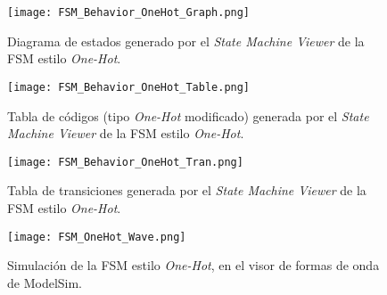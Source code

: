 \begin{figure}[ht]
	\centering
	\texttt{[image: FSM\_Behavior\_OneHot\_Graph.png]}
	\caption{Diagrama de estados generado por el \textit{State Machine Viewer} de la FSM estilo \textit{One-Hot}. \label{fig:FSM_Behavior_OneHot_Graph}}
\end{figure}

\begin{figure}[ht]
	\centering
	\texttt{[image: FSM\_Behavior\_OneHot\_Table.png]}
	\caption{Tabla de códigos (tipo \textit{One-Hot} modificado) generada por el \textit{State Machine Viewer} de la FSM estilo \textit{One-Hot}. \label{fig:FSM_Behavior_OneHot_Table}}
\end{figure}

\begin{figure}[ht]
	\centering
	\texttt{[image: FSM\_Behavior\_OneHot\_Tran.png]}
	\caption{Tabla de transiciones generada por el \textit{State Machine Viewer} de la FSM estilo \textit{One-Hot}. \label{fig:FSM_Behavior_OneHot_Tran}}
\end{figure}

\begin{figure}[ht]
	\centering
	\texttt{[image: FSM\_OneHot\_Wave.png]}
	\caption{Simulación de la FSM estilo \textit{One-Hot}, en el visor de formas de onda de ModelSim. \label{fig:FSM_Behavior_OneHot_Wave}}
\end{figure}